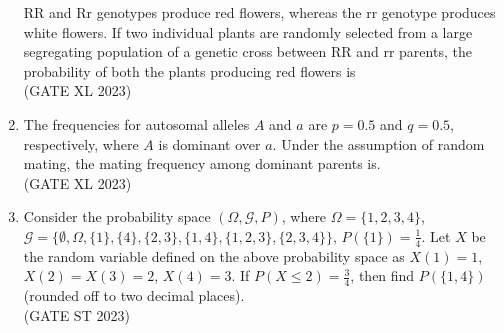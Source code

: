\begin{enumerate}[label=\thechapter.\arabic*,ref=\thechapter.\theenumi]
RR and Rr genotypes produce red flowers, whereas the rr genotype produces
white flowers. If two individual plants are randomly selected from a large
segregating population of a genetic cross between RR and rr parents, the
probability of both the plants producing red flowers is\\
\hfill(GATE XL 2023)\\

\item The frequencies for autosomal alleles $A$ and $a$ are $p = 0.5$ and $q = 0.5$,
respectively, where $A$ is dominant over $a$. Under the assumption of random
mating, the mating frequency among dominant parents is.\\
\hfill(GATE XL 2023)\\

\item Consider the probability space $(\Omega, \mathcal{G}, P)$, where 
   $ \Omega = \{1, 2, 3, 4\}$, 
    $\mathcal{G} = \{\emptyset, \Omega, \{1\}, \{4\}, \{2, 3\}, \{1, 4\}, \{1, 2, 3\}, \{2, 3, 4\}\}$, 
    $P(\{1\}) = \frac{1}{4}$.
Let $X$ be the random variable defined on the above probability space as
   $ X(1) = 1$, 
    $X(2) = X(3) = 2$, 
    $X(4) = 3$.
If $P(X \leq 2) = \frac{3}{4}$, then find $P(\{1, 4\})$ (rounded off to two decimal places).\\\hfill (GATE ST 2023)\\

\end{enumerate}
